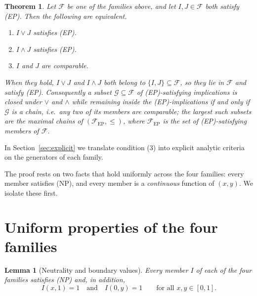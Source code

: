 \documentclass{amsart}
\theoremstyle{plain}
\newtheorem{theorem}{Theorem}
\newtheorem{lemma}{Lemma}
\theoremstyle{definition}
\newcommand{\Fcal}{\mathcal{F}}
\begin{document}
\begin{theorem}\label{thm:main}
Let $\Fcal$ be one of the families above, and let $I,J\in\Fcal$ both satisfy \textup{(EP)}.
Then the following are equivalent.
\begin{enumerate}
\item $I\vee J$ satisfies \textup{(EP)}.
\item $I\wedge J$ satisfies \textup{(EP)}.
\item $I$ and $J$ are comparable.
\end{enumerate}
When they hold, $I\vee J$ and $I\wedge J$ both belong to $\{I,J\}\subseteq\Fcal$, so they
lie in $\Fcal$ and satisfy \textup{(EP)}. Consequently a subset
$\mathcal{G}\subseteq\Fcal$ of \textup{(EP)}-satisfying implications is closed under $\vee$
and $\wedge$ while remaining inside the \textup{(EP)}-implications if and only if
$\mathcal{G}$ is a \emph{chain}, i.e.\ any two of its members are comparable; the largest
such subsets are the maximal chains of $(\Fcal_{\mathrm{EP}},\le)$, where
$\Fcal_{\mathrm{EP}}$ is the set of \textup{(EP)}-satisfying members of $\Fcal$.
\end{theorem}

In Section~\ref{sec:explicit} we translate condition (3) into explicit analytic criteria
on the generators of each family.

\medskip
The proof rests on two facts that hold uniformly across the four families: every member
satisfies (NP), and every member is a \emph{continuous} function of $(x,y)$. We isolate
these first.

\section{Uniform properties of the four families}

\begin{lemma}[Neutrality and boundary values]\label{lem:NP}
Every member $I$ of each of the four families satisfies \textup{(NP)} and, in addition,
\begin{equation}\label{eq:topright}
I(x,1)=1\quad\text{and}\quad I(0,y)=1\qquad\text{for all }x,y\in[0,1].
\end{equation}
\end{lemma}
\end{document}
